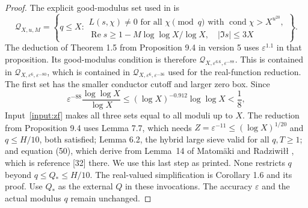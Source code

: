 \documentclass[11pt]{article}
\theoremstyle{definition}
\DeclareMathOperator{\Rea}{Re}
\DeclareMathOperator{\cond}{cond}
\begin{document}
\begin{proof}
The explicit good-modulus set used in
\cite[Lemma 8.1]{KMT} is
\[
 \mathcal Q_{X,u,M}=
 \left\{q\le X:
 \begin{array}{l}
 L(s,\chi)\ne0\text{ for all }\chi\pmod q\text{ with }
                         \cond\chi>X^{u^{20}},\\
 \Rea s\ge1-M\log\log X/\log X,
                         \quad |\Im s|\le3X
 \end{array}\right\}.
\]
The deduction of Theorem 1.5 from Proposition 9.4 in version 5 uses
$\varepsilon^{1.1}$ in that proposition. Its good-modulus condition is
therefore $\mathcal Q_{X,\varepsilon^{6.6},\varepsilon^{-88}}$.
This is contained in
$\mathcal Q_{X,\varepsilon^6,\varepsilon^{-80}}$, which is contained in
$\mathcal Q_{X,\varepsilon^6,\varepsilon^{-36}}$ used for the real-function
reduction. The first set has the smaller conductor cutoff and larger
zero box. Since
\[
 \varepsilon^{-88}\frac{\log\log X}{\log X}
 \le (\log X)^{-0.912}\log\log X<\frac18,
\]
Input~\ref{input:zf} makes all three sets equal to all moduli up to $X$.
The reduction from Proposition 9.4 uses Lemma 7.7, which needs
$Z=\varepsilon^{-11}\le(\log X)^{1/20}$ and $q\le H/10$, both satisfied;
Lemma 6.2, the hybrid large sieve valid for all $q,T\ge1$; and
equation (50), which \cite{KMT} derive from Lemma~14 of Matom\"aki and Radziwi\l\l
\cite{MR2016}, which is reference [32] there.
We use this last step as printed. None restricts $q$ beyond
$q\le Q_*\le H/10$. The real-valued simplification is Corollary 1.6 and its proof.
Use $Q_*$ as the external $Q$ in these invocations. The accuracy
$\varepsilon$ and the actual modulus $q$ remain unchanged.


\end{proof}
\end{document}
